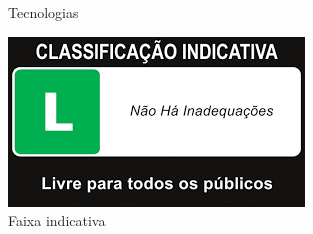 \begin{figure}[!h]
	\centering
	\quad
	\quad
	\caption{Tecnologias}
\end{figure}

\begin{figure}[!h]
	\centering
		\includegraphics[keepaspectratio=true,scale=0.6]{figuras/indicativa}
	\caption{Faixa indicativa}
\end{figure}

